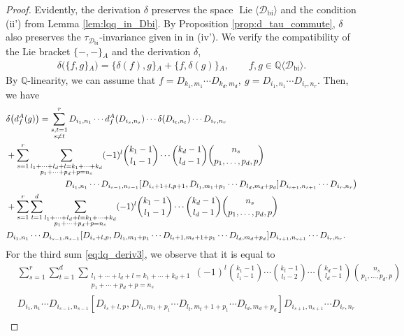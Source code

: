 \documentclass[12pt,reqno]{amsart}
\numberwithin{equation}{section}
\theoremstyle{definition}
\newcommand{\QQ}{\mathbb{Q}}
\newcommand{\Dbi}{\mathcal{D}_{\operatorname{bi}}}
\newcommand{\QDbi}{\QQ\langle \Dbi\rangle}
\newcommand{\LieDbi}{\operatorname{Lie}\langle \Dbi\rangle}
\newcommand{\ariemp}{\{-,-\}\!_A}
\newcommand{\ari}[2]{\{#1,#2\}\!_A}
\newcommand{\der}[1]{d_{#1}^A}
\begin{document}
\begin{proof} Evidently, the derivation $\delta$ preserves the space $\LieDbi$ and the condition (ii') from Lemma \ref{lem:lqq_in_Dbi}. By Proposition \ref{prop:d_tau_commute}, $\delta$ also preserves the $\tau_{\Dbi}$-invariance given in in (iv'). 
We verify the compatibility of the Lie bracket $\ariemp$ and the derivation $\delta$,
\begin{align} \label{eq:lq_deriv_liebrack}
\delta\big(\ari{f}{g}\big)=\ari{\delta(f)}{g}+\ari{f}{\delta(g)},\qquad f,g\in\QDbi.
\end{align} 
By $\QQ$-linearity, we can assume that $f=D_{k_1,m_1}\cdots D_{k_d,m_d},\ g=D_{i_1,n_1}\cdots D_{i_r,n_r}$. Then, we have 
\begin{align} \label{eq:lq_deriv1}
&\delta\big(\der{f}(g)\big)= \sum_{\substack{s,t=1 \\ s\neq t}}^r D_{i_1,n_1}\cdots \der{f}(D_{i_s,n_s})\cdots \delta(D_{i_t,n_t})\cdots D_{i_r,n_r} \\
\label{eq:lq_deriv2}
&+\sum_{s=1}^r\sum_{\substack{l_1+\cdots+l_d+l=k_1+\cdots+k_d \\ p_1+\cdots+p_d+p=n_s}} (-1)^l\binom{k_1-1}{l_1-1}\cdots \binom{k_d-1}{l_d-1} \binom{n_s}{p_1,\ldots,p_d,p}  \\
&\hspace{2.4cm} D_{i_1,n_1}\cdots D_{i_{s-1},n_{s-1}}[D_{i_s+1+l,p+1},D_{l_1,m_1+p_1}\cdots D_{l_d,m_d+p_d}]D_{i_{s+1},n_{s+1}}\cdots D_{i_r,n_r}\big)  \nonumber \\
\label{eq:lq_deriv3}
&+\sum_{s=1}^r \sum_{t=1}^d\sum_{\substack{l_1+\cdots+l_d+l=k_1+\cdots+k_d \\ p_1+\cdots+p_d+p=n_s}} (-1)^l\binom{k_1-1}{l_1-1}\cdots\binom{k_d-1}{l_d-1} \binom{n_s}{p_1,\ldots,p_d,p} \\
&D_{i_1,n_1}\cdots D_{i_{s-1},n_{s-1}}[D_{i_s+l,p},D_{l_1,m_1+p_1}\cdots D_{l_t+1,m_t+1+p_1} \cdots D_{l_d,m_d+p_d}]D_{i_{s+1},n_{s+1}}\cdots D_{i_r,n_r}. \nonumber
\end{align}
For the third sum \eqref{eq:lq_deriv3}, we observe that it is equal to
\begin{align*}
&\sum_{s=1}^r \sum_{t=1}^d\sum_{\substack{l_1+\cdots+l_d+l=k_1+\cdots+k_d+1 \\ p_1+\cdots+p_d+p=n_s}} (-1)^l\binom{k_1-1}{l_1-1}\cdots \binom{k_t-1}{l_t-2}\cdots \binom{k_d-1}{l_d-1} \binom{n_s}{p_1,\ldots,p_d,p} \\
&D_{i_1,n_1}\cdots D_{i_{s-1},n_{s-1}}[D_{i_s+l,p},D_{l_1,m_1+p_1}\cdots D_{l_t,m_t+1+p_1} \cdots D_{l_d,m_d+p_d}]D_{i_{s+1},n_{s+1}}\cdots D_{i_r,n_r}\\

\end{align*}
\end{proof}
\end{document}
